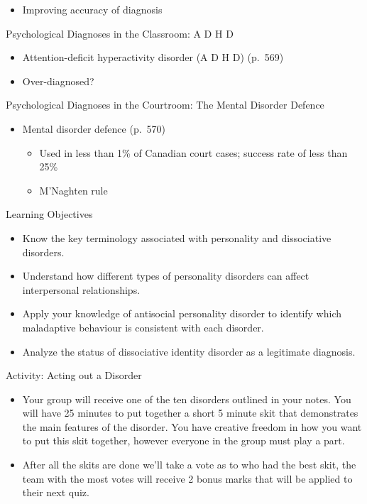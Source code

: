 \documentclass[
]{book}
\providecommand{\tightlist}{%
  \setlength{\itemsep}{0pt}\setlength{\parskip}{0pt}}
\begin{document}
\begin{reflect}
\begin{itemize}
  \begin{itemize}
  \tightlist
  \item
    Improving accuracy of diagnosis
  \end{itemize}
\end{itemize}

Psychological Diagnoses in the Classroom: A D H D

\begin{itemize}
\tightlist
\item
  Attention-deficit hyperactivity disorder (A D H D) (p.~569)\\
\item
  Over-diagnosed?
\end{itemize}

Psychological Diagnoses in the Courtroom: The Mental Disorder Defence

\begin{itemize}
\tightlist
\item
  Mental disorder defence (p.~570)

  \begin{itemize}
  \tightlist
  \item
    Used in less than 1\% of Canadian court cases; success rate of less than 25\%\\
  \item
    M'Naghten rule
  \end{itemize}
\end{itemize}

Learning Objectives

\begin{itemize}
\tightlist
\item
  Know the key terminology associated with personality and dissociative disorders.\\
\item
  Understand how different types of personality disorders can affect interpersonal relationships.\\
\item
  Apply your knowledge of antisocial personality disorder to identify which maladaptive behaviour is consistent with each disorder.\\
\item
  Analyze the status of dissociative identity disorder as a legitimate diagnosis.
\end{itemize}

Activity: Acting out a Disorder

\begin{itemize}
\tightlist
\item
  Your group will receive one of the ten disorders outlined in your notes. You will have 25 minutes to put together a short 5 minute skit that demonstrates the main features of the disorder. You have creative freedom in how you want to put this skit together, however everyone in the group must play a part.\\
\item
  After all the skits are done we'll take a vote as to who had the best skit, the team with the most votes will receive 2 bonus marks that will be applied to their next quiz.
\end{itemize}


\end{reflect}
\end{document}

